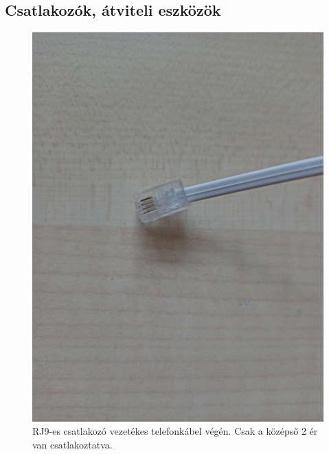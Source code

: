 \documentclass[tocnopagenum]{thesis-ekf}
\theoremstyle{definition}
\theoremstyle{remark}
\begin{document}
	\subsection{Csatlakozók, átviteli eszközök}
	\begin{figure}[h!]
		\centering
		\includegraphics[scale=0.075]{images/foto_rj9.jpg}
		\caption{RJ9-es csatlakozó vezetékes telefonkábel végén. Csak a középső 2 ér van csatlakoztatva.}
		\label{fig:foto_rj9}
	
	\end{figure}	
	
\end{document}
